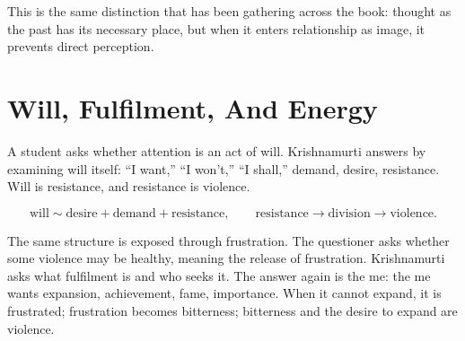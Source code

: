 \documentclass[11pt,oneside]{book}
\begin{document}
\begin{figure}
\centering
{}
\end{figure}

This is the same distinction that has been gathering across the book: thought as the past has its necessary place, but when it enters relationship as image, it prevents direct perception.

\section{Will, Fulfilment, And Energy}

A student asks whether attention is an act of will. Krishnamurti answers by examining will itself: ``I want,'' ``I won't,'' ``I shall,'' demand, desire, resistance. Will is resistance, and resistance is violence.

\begin{equation}
\text{will}
\sim
\text{desire}+\text{demand}+\text{resistance},
\qquad
\text{resistance}
\longrightarrow
\text{division}
\longrightarrow
\text{violence}.
\end{equation}

The same structure is exposed through frustration. The questioner asks whether some violence may be healthy, meaning the release of frustration. Krishnamurti asks what fulfilment is and who seeks it. The answer again is the me: the me wants expansion, achievement, fame, importance. When it cannot expand, it is frustrated; frustration becomes bitterness; bitterness and the desire to expand are violence.
\end{document}
